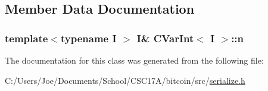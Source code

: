 \subsection{Member Data Documentation}
\hypertarget{class_c_var_int_a4514adc82b41754d9ac22ee627744614}{}
\subsubsection[{n}]{\setlength{\rightskip}{0pt plus 5cm}template$<$typename I $>$ I\& {\bf C\+Var\+Int}$<$ I $>$\+::n\hspace{0.3cm}{\ttfamily [protected]}}\label{class_c_var_int_a4514adc82b41754d9ac22ee627744614}


The documentation for this class was generated from the following file\+:\begin{DoxyCompactItemize}
\item 
C\+:/\+Users/\+Joe/\+Documents/\+School/\+C\+S\+C17\+A/bitcoin/src/\hyperlink{serialize_8h}{serialize.\+h}\end{DoxyCompactItemize}

